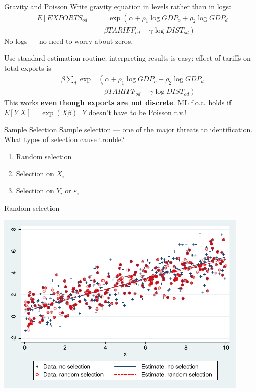 \documentclass[pdftex]{beamer}
\begin{document}
\begin{frame}{Gravity and Poisson}
	Write gravity equation in levels rather than in logs:
	\begin{align*}
		E[EXPORTS_{od}] &= \exp\left(\alpha + \rho_1\log{GDP_o} + \rho_2\log{GDP_d}\right.\\
		 &- \left.\beta{}TARIFF_{od} - \gamma\log{DIST_{od}}\right)
	\end{align*}
	No logs --- no need to worry about zeros. 
	
	Use standard estimation routine; interpreting results is easy: effect of tariffs on total exports is 
	\begin{align*}
		\beta\sum_d\exp&\left(\alpha + \rho_1\log{GDP_o} + \rho_2\log{GDP_d}\right.\\
		 &- \left.\beta{}TARIFF_{od} - \gamma\log{DIST_{od}}\right)
	\end{align*}
	This works \textbf{even though exports are not discrete}. ML f.o.c. holds if $E[Y|X] = \exp(X\beta)$. $Y$ doesn't have to be Poisson r.v.!
\end{frame}

\begin{frame}{Sample Selection}
	Sample selection --- one of the major threats to identification. What types of selection cause trouble?
	\begin{enumerate}
		\item Random selection
		\item Selection on $X_i$
		\item Selection on $Y_i$ or $\varepsilon_i$
	\end{enumerate}
\end{frame}
\begin{frame}{Random selection}
	\begin{center}
		\includegraphics[width=0.9\textwidth]{graphs/selection_random.pdf}
	\end{center}
\end{frame}
\end{document}
